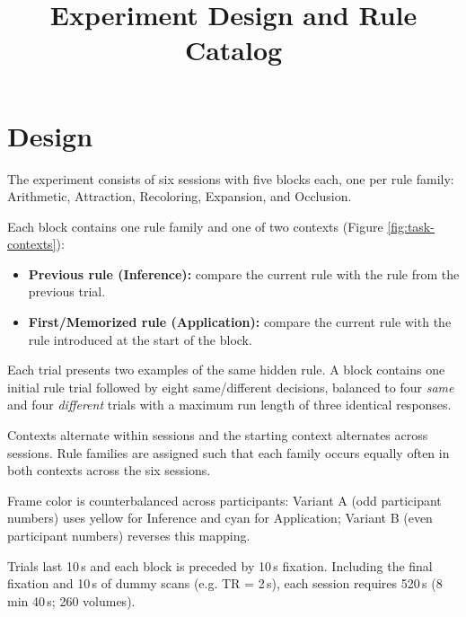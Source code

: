 \documentclass[a4paper,12pt]{article}
\title{Experiment Design and Rule Catalog}
\author{}
\date{}
\begin{document}
\vspace*{-2cm}
{\let\newpage\relax\maketitle}

\vspace*{-1cm}
\section*{Design}

The experiment consists of six sessions with five blocks each, one per rule family: Arithmetic, Attraction, Recoloring, Expansion, and Occlusion.

Each block contains one rule family and one of two contexts (Figure \ref{fig:task-contexts}):

\begin{itemize}
    \item \textbf{Previous rule (Inference):} compare the current rule with the rule from the previous trial.
    \item \textbf{First/Memorized rule (Application):} compare the current rule with the rule introduced at the start of the block.
\end{itemize}

Each trial presents two examples of the same hidden rule. A block contains one initial rule trial followed by eight same/different decisions, balanced to four \textit{same} and four \textit{different} trials with a maximum run length of three identical responses.

Contexts alternate within sessions and the starting context alternates across sessions. Rule families are assigned such that each family occurs equally often in both contexts across the six sessions.

Frame color is counterbalanced across participants: Variant A (odd participant numbers) uses yellow for Inference and cyan for Application; Variant B (even participant numbers) reverses this mapping.

Trials last 10\,s and each block is preceded by 10\,s fixation. Including the final fixation and 10\,s of dummy scans (e.g. TR = 2\,s), each session requires 520\,s (8\,min 40\,s; 260 volumes).

\newpage
{}
\thispagestyle{empty}
\end{document}
